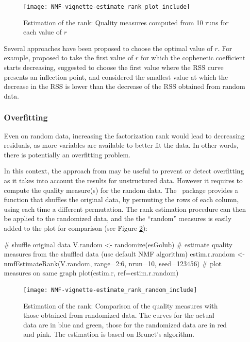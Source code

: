 \documentclass[a4paper]{article}
\newcommand{\nmfpack}{\code{NMF}\ }
\begin{document}
\begin{figure}\label{fig:estim_all}
\texttt{[image: NMF-vignette-estimate\_rank\_plot\_include]}
\caption{Estimation of the rank: Quality measures computed from 10 runs for each 
value of $r$}
\end{figure}

Several approaches have been proposed to choose the optimal value of $r$.
For example, \cite{Brunet04} proposed to take the first value of $r$ for which 
the cophenetic coefficient starts decreasing, \cite{Hutchins2008} suggested to 
choose the first value where the RSS curve presents an inflection point, 
and \cite{Frigyesi2008} considered the smallest value at which the decrease in 
the RSS is lower than the decrease of the RSS obtained from random data.

\subsubsection{Overfitting}
Even on random data, increasing the factorization rank would lead to decreasing 
residuals, as more variables are available to better fit the data.
In other words, there is potentially an overfitting problem. 
 
In this context, the approach from \cite{Frigyesi2008} may be useful to prevent 
or detect overfitting as it takes into account the results for unstructured data.
However it requires to compute the quality measure(s) for the random data.
The \nmfpack package provides a function that shuffles the original data, 
by permuting the rows of each column, using each time a different permutation.
The rank estimation procedure can then be applied to the randomized data, and the 
the ``random'' measures is easily added to the plot for comparison 
(see Figure \ref{fig:estim_all_rd}):

\begin{Schunk}
\begin{Sinput}
 # shuffle original data
 V.random <- randomize(esGolub)
 # estimate quality measures from the shuffled data (use default NMF algorithm)
 estim.r.random <- nmfEstimateRank(V.random, range=2:6, nrun=10, seed=123456)
 # plot measures on same graph
 plot(estim.r, ref=estim.r.random)
\end{Sinput}
\end{Schunk}

\begin{figure}\label{fig:estim_all_rd}
\texttt{[image: NMF-vignette-estimate\_rank\_random\_include]}
\caption{Estimation of the rank: Comparison of the quality measures with those 
obtained from randomized data. The curves for the actual data are in blue and green, 
those for the randomized data are in red and pink. The estimation is based on Brunet's algorithm.}
\end{figure}
\end{document}
